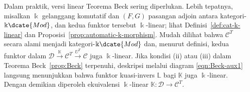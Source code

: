 Dalam praktik, versi linear Teorema Beck sering diperlukan. Lebih tepatnya,
misalkan $\Bbbk$ gelanggang komutatif dan $(F,G)$ pasangan adjoin antara
kategori-$\Bbbk\dcate{Mod}$, dan kedua funktor tersebut $\Bbbk$-linear;
lihat Definisi~\ref{def:cat-k-linear} dan
Proposisi~\ref{prop:automatic-k-morphism}. Mudah dilihat bahwa
$\mathcal{C}^T$ secara alami menjadi kategori-$\Bbbk\dcate{Mod}$ dan, menurut
definisi, kedua funktor dalam
$\mathcal{D}\xrightarrow{\mathbb{K}}\mathcal{C}^T\xrightarrow{U^T}\mathcal{C}$
juga $\Bbbk$-linear. Jika kondisi (ii) atau (iii) dalam
Teorema Beck~\ref{prop:Beck} terpenuhi, deskripsi melalui diagram
\eqref{eqn:Beck-aux1} langsung menunjukkan bahwa funktor kuasi-invers
$\mathbb{L}$ bagi $\mathbb{K}$ juga $\Bbbk$-linear. Dengan demikian diperoleh
ekuivalensi $\Bbbk$-linear
$\mathbb{K}:\mathcal{D}\to\mathcal{C}^T$.
